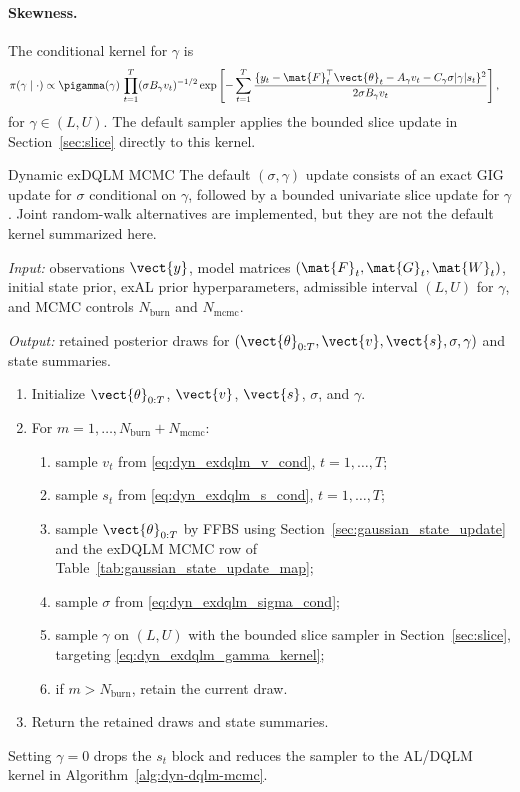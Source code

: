 \paragraph{Skewness.}
The conditional kernel for $\gamma$ is
\begin{align}
\pi(\gamma\mid\cdot)
&\propto \pigamma(\gamma)\,
\prod_{t=1}^T(\sigma B_\gamma v_t)^{-1/2}
\exp\left[
-\sum_{t=1}^T
\frac{
\{y_t-\mat{F}_t^\top\vect{\theta}_t-A_\gamma v_t-C_\gamma\sigma|\gamma|s_t\}^2
}{2\sigma B_\gamma v_t}
\right],
\label{eq:dyn_exdqlm_gamma_kernel}
\end{align}
for $\gamma\in(L,U)$. The default sampler applies the bounded slice update in
Section~\ref{sec:slice} directly to this kernel.

\begin{suppalgorithm}{Dynamic exDQLM MCMC}
\label{alg:dyn-exdqlm-mcmc}
The default $(\sigma,\gamma)$ update consists of an exact GIG update for
$\sigma$ conditional on $\gamma$, followed by a bounded univariate slice update
for $\gamma$. Joint random-walk alternatives are implemented, but they are not
the default kernel summarized here.
\par\noindent\emph{Input:} observations $\vect{y}$, model matrices
$(\mat{F}_t,\mat{G}_t,\mat{W}_t)$, initial state prior, exAL prior
hyperparameters, admissible interval $(L,U)$ for $\gamma$, and MCMC controls
$N_{\mathrm{burn}}$ and $N_{\mathrm{mcmc}}$.
\par\noindent\emph{Output:} retained posterior draws for
$(\vect{\theta}_{0:T},\vect{v},\vect{s},\sigma,\gamma)$ and state summaries.
\begin{enumerate}[label=(\arabic*)]
\item Initialize $\vect{\theta}_{0:T}$, $\vect{v}$, $\vect{s}$, $\sigma$, and
$\gamma$.
\item For $m=1,\ldots,N_{\mathrm{burn}}+N_{\mathrm{mcmc}}$:
  \begin{enumerate}[label=(\alph*)]
  \item sample $v_t$ from \eqref{eq:dyn_exdqlm_v_cond}, $t=1,\ldots,T$;
  \item sample $s_t$ from \eqref{eq:dyn_exdqlm_s_cond}, $t=1,\ldots,T$;
  \item sample $\vect{\theta}_{0:T}$ by FFBS using
  Section~\ref{sec:gaussian_state_update} and the exDQLM MCMC row of
  Table~\ref{tab:gaussian_state_update_map};
  \item sample $\sigma$ from \eqref{eq:dyn_exdqlm_sigma_cond};
  \item sample $\gamma$ on $(L,U)$ with the bounded slice sampler in
  Section~\ref{sec:slice}, targeting \eqref{eq:dyn_exdqlm_gamma_kernel};
  \item if $m>N_{\mathrm{burn}}$, retain the current draw.
  \end{enumerate}
\item Return the retained draws and state summaries.
\end{enumerate}
\end{suppalgorithm}
Setting $\gamma=0$ drops the $s_t$ block and reduces the sampler to the
AL/DQLM kernel in Algorithm~\ref{alg:dyn-dqlm-mcmc}.

